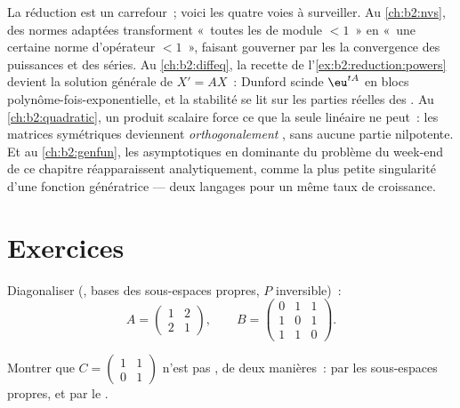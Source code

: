 \begin{remark}\label{rem:b2:reduction:perspectives}
La réduction est un carrefour~; voici les quatre voies à surveiller.
Au \cref{ch:b2:nvs}, des normes adaptées transforment «~toutes les
 de module $< 1$~» en «~une certaine norme d'opérateur
$< 1$~», faisant gouverner par les  la convergence des
puissances et des séries. Au \cref{ch:b2:diffeq}, la recette de
l'\cref{ex:b2:reduction:powers} devient la solution générale de $X' =
AX$~: Dunford scinde $\eu^{tA}$ en blocs
polynôme-fois-exponentielle, et la stabilité se lit sur les parties
réelles des . Au \cref{ch:b2:quadratic}, un produit
scalaire force ce que la seule  linéaire ne peut~: les matrices
symétriques deviennent \emph{orthogonalement} , sans
aucune partie nilpotente. Et au \cref{ch:b2:genfun}, les asymptotiques
en  dominante du problème du week-end de ce chapitre
réapparaissent analytiquement, comme la plus petite singularité d'une
fonction génératrice --- deux langages pour un même taux de
croissance.
\end{remark}

\section{Exercices}

\begin{exercise}[$\star$]\label{exo:b2:reduction:1}
Diagonaliser (, bases des sous-espaces propres, $P$
inversible)~:
\[
A = \begin{pmatrix} 1 & 2\\ 2 & 1 \end{pmatrix},
\qquad
B = \begin{pmatrix} 0 & 1 & 1\\ 1 & 0 & 1\\ 1 & 1 & 0
\end{pmatrix}.
\]
\end{exercise}

\begin{exercise}[$\star$]\label{exo:b2:reduction:2}
Montrer que $C = \begin{pmatrix} 1 & 1\\ 0 & 1\end{pmatrix}$ n'est pas
, de deux manières~: par les sous-espaces propres, et
par le .
\end{exercise}

